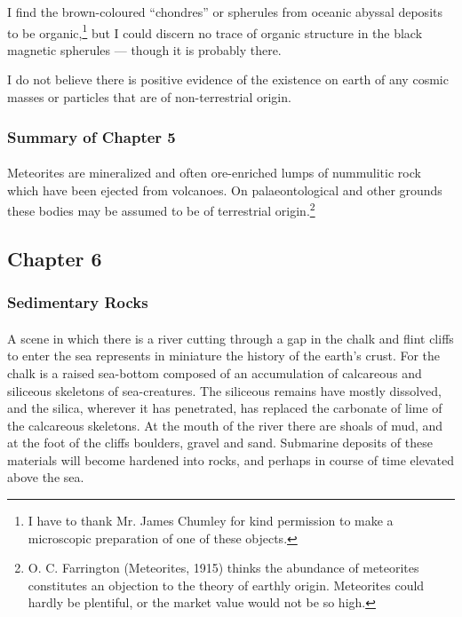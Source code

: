 \documentclass[a4paper, 12pt, oneside, landscape]{article}
\begin{document}
I find the brown-coloured ``chondres'' or spherules from oceanic abyssal deposits to be organic,\footnote{I have to thank Mr. James Chumley for kind permission to make a microscopic preparation of one of these objects.} but I could discern no trace of organic structure in the black magnetic spherules --- though it is probably there.

I do not believe there is positive evidence of the existence on earth of any cosmic masses or particles that are of non-terrestrial origin.

\subsubsection{Summary of Chapter 5}
\paragraph{}
Meteorites are mineralized and often ore-enriched lumps of nummulitic rock which have been ejected from volcanoes. On palaeontological and other grounds these bodies may be assumed to be of terrestrial origin.\footnote{O. C. Farrington (Meteorites, 1915) thinks the abundance of meteorites constitutes an objection to the theory of earthly origin. Meteorites could hardly be plentiful, or the market value would not be so high.}
\clearpage
\subsection{Chapter 6}
\subsubsection{Sedimentary Rocks}
\paragraph{}
A scene in which there is a river cutting through a gap in the chalk and flint cliffs to enter the sea represents in miniature the history of the earth's crust. For the chalk is a raised sea-bottom composed of an accumulation of calcareous and siliceous skeletons of sea-creatures. The siliceous remains have mostly dissolved, and the silica, wherever it has penetrated, has replaced the carbonate of lime of the calcareous skeletons. At the mouth of the river there are shoals of mud, and at the foot of the cliffs boulders, gravel and sand. Submarine deposits of these materials will become hardened into rocks, and perhaps in course of time elevated above the sea.
\end{document}
